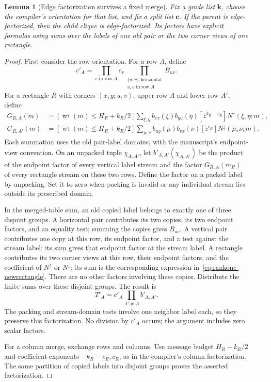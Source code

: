 \documentclass[11pt]{article}
\newtheorem{lemma}[theorem]{Lemma}
\theoremstyle{definition}
\theoremstyle{remark}
\begin{document}
\begin{lemma}[Edge factorization survives a fixed merge]
\label{lem:rankone-closure}
Fix a grade list $\mathbf k$, choose the compiler's orientation for
that list, and fix a split list $\mathbf c$. If the parent is
edge-factorized, then the child clique is edge-factorized. Its factors
have explicit formulas using sums over the labels of one old pair or
the two corner views of one rectangle.
\end{lemma}
\begin{proof}
First consider the row orientation. For a row $A$, define
\[
 c'_A=
 \prod_{v\text{ in row }A}c_v
 \prod_{\substack{\{u,v\}\text{ horizontal}\\u,v\text{ in row }A}}B_{uv}.
 \tag{\thesection.7}\label{eq:rankone-newscalar}
\]
For a rectangle $R$ with corners $(x,y;u,v)$, upper row $A$ and lower
row $A'$, define
\begin{align*}
 G_{R,A}(m)
 &= [\operatorname{wt}(m)\le H_R+k_R/2]
    \sum_{\xi,\eta}
       b_{xv}(\xi)b_{yu}(\eta)
       [z^{k_R-c_R}]N^{\uparrow}(\xi,\eta;m),\\
 G_{R,A'}(m)
 &= [\operatorname{wt}(m)\le H_R+k_R/2]
    \sum_{\mu,\nu}
       b_{uy}(\mu)b_{vx}(\nu)
       [z^{c_R}]N^{\downarrow}(\mu,\nu;m).
 \tag{\thesection.8}\label{eq:rankone-newrectangle}
\end{align*}
Each summation uses the old pair-label domains, with the manuscript's
endpoint-view convention. On an unpacked tuple $\chi_{A,A'}$, let
$b'_{A,A'}(\chi_{A,A'})$ be the product of the endpoint factor of every
vertical label stream and the factor $G_{R,A}(m_R)$ of every rectangle
stream on these two rows. Define the factor on a packed label by
unpacking. Set it to zero when packing is invalid or any individual
stream lies outside its prescribed domain.

In the merged-table sum, an old copied label belongs to exactly one
of three disjoint groups. A horizontal pair contributes its two
copies, its two endpoint factors, and an equality test; summing the
copies gives $B_{uv}$. A vertical pair contributes one copy at this
row, its endpoint factor, and a test against the stream label; its sum
gives that endpoint factor at the stream label. A rectangle contributes
its two corner views at this row, their endpoint factors, and the
coefficient of $N^{\uparrow}$ or $N^{\downarrow}$; its sum is the
corresponding expression in~\eqref{eq:rankone-newrectangle}. There are
no other factors involving these copies. Distribute the finite sums
over these disjoint groups. The result is
\[
 T'_A=c'_A\prod_{A'\ne A}b'_{A,A'}.
\]
The packing and stream-domain tests involve one neighbor label each,
so they preserve this factorization. No division by $c'_A$ occurs;
the argument includes zero scalar factors.

For a column merge, exchange rows and columns. Use message budget
$H_R-k_R/2$ and coefficient exponents $-k_R-c_R,c_R$, as in the
compiler's column factorization. The same partition of copied labels
into disjoint groups proves the asserted factorization.
\end{proof}
\end{document}
